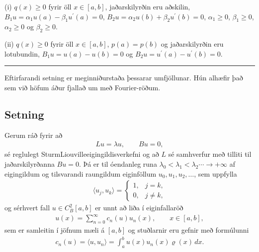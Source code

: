 \documentclass[a4paper,10pt,icelandic]{sphinxmanual}
\begin{document}
(i) \(q(x)\geq 0\) fyrir öll \(x\in [a,b]\), jaðarskilyrðin eru
aðskilin, \(B_1u=\alpha_1u(a)-\beta_1u{{^{\prime}}}(a)=0\),
\(B_2u=\alpha_2u(b)+\beta_2u{{^{\prime}}}(b)=0\),
\(\alpha_1\geq 0\), \(\beta_1\geq 0\), \(\alpha_2\geq 0\) og
\(\beta_2\geq 0\).

(ii) \(q(x)\geq 0\) fyrir öll \(x\in [a,b]\), \(p(a)=p(b)\)
og jaðarskilyrðin eru lotubundin, \(B_1u=u(a)-u(b)=0\) og
\(B_2u=u{{^{\prime}}}(a)-u{{^{\prime}}}(b)=0\).


\bigskip\hrule\bigskip


Eftirfarandi setning er meginniðurstaða þessarar umfjöllunar. Hún alhæfir það sem við höfum áður fjallað um með Fourier-röðum.


\subsection{Setning}
\label{\detokenize{Kafli03:id7}}
Gerum ráð fyrir að
\begin{equation*}
\begin{split}Lu={\lambda} u, \qquad Bu=0,\end{split}
\end{equation*}
sé reglulegt Sturm\textendash{}Liouville\textendash{}eigingildisverkefni og að \(L\) sé
samhverfur með tilliti til jaðarskilyrðanna \(Bu=0\). Þá er til
óendanleg runa \({\lambda}_0<{\lambda}_1<{\lambda}_2\cdots \to +{\infty}\) af eigingildum og tilsvarandi raungildum eiginföllum
\(u_0,u_1,u_2,\dots\), sem uppfylla
\begin{equation*}
\begin{split}{{\langle u_j,u_k\rangle}}=\begin{cases} 1, &j=k,\\0, &j\neq k,\end{cases}\end{split}
\end{equation*}
og sérhvert fall \(u\in C^2_B[a,b]\) er unnt að liða í eiginfallaröð
\begin{equation*}
\begin{split}u(x)=\sum\limits_{n=0}^{\infty} c_n(u)u_n(x), \qquad x\in [a,b],\end{split}
\end{equation*}
sem er samleitin í jöfnum mæli á \([a,b]\) og stuðlarnir eru gefnir
með formúlunni
\begin{equation*}
\begin{split}c_n(u)={{\langle u,u_n\rangle}}= \int_a^bu(x)u_n(x){\varrho}(x)\, dx.\end{split}
\end{equation*}
\end{document}
